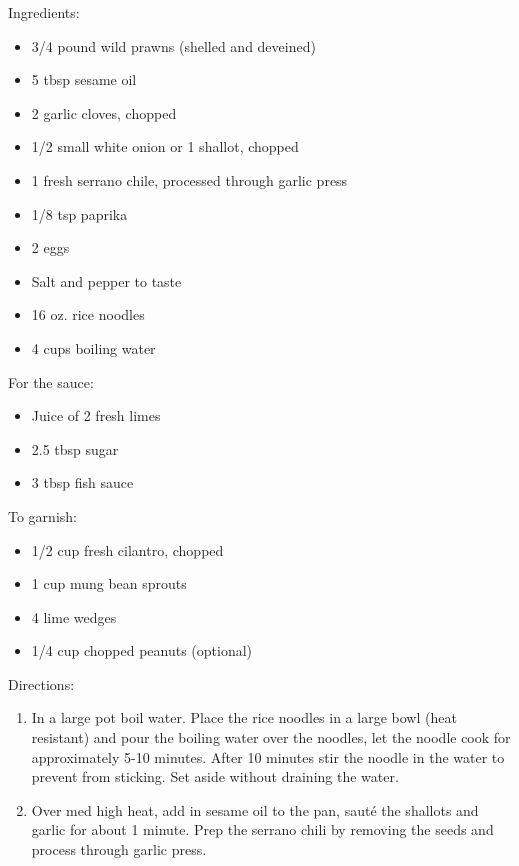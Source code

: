 \documentclass{article}
\begin{document}
%
%
%
%
%

\begin{multicols}{2}
Ingredients:
\begin{itemize}
\item 3/4 pound wild prawns (shelled and deveined)
\item 5 tbsp sesame oil
\item 2 garlic cloves, chopped
\item 1/2 small white onion or 1 shallot, chopped
\item 1 fresh serrano chile, processed through garlic press
\item 1/8 tsp paprika
\item 2 eggs
\item Salt and pepper to taste
\item 16 oz. rice noodles
\item 4 cups boiling water
\end{itemize}

For the sauce:
\begin{itemize}
\item Juice of 2 fresh limes
\item 2.5 tbsp sugar
\item 3 tbsp fish sauce
\end{itemize}

To garnish:
\begin{itemize}
\item 1/2 cup fresh cilantro, chopped
\item 1 cup mung bean sprouts
\item 4 lime wedges
\item 1/4 cup chopped peanuts (optional)
\end{itemize}

\columnbreak

Directions:
\begin{enumerate}
\item In a large pot boil water. Place the rice noodles in a large bowl (heat resistant) and pour the boiling water over the noodles, let the noodle cook for approximately 5-10 minutes. After 10 minutes stir the noodle in the water to prevent from sticking. Set aside without draining the water.

\item Over med high heat, add in sesame oil to the pan, sauté the shallots and garlic for about 1 minute. Prep the serrano chili by removing the seeds and process through garlic press.


\end{enumerate}
\end{multicols}
\end{document}
